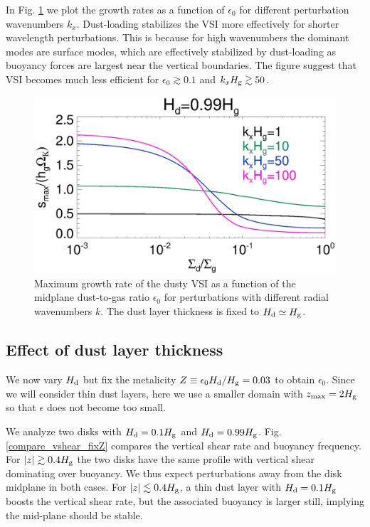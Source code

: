 In Fig. \ref{vsi_dust_loading_vareps} we plot the growth rates as a
function of $\epsilon_0$ for different perturbation wavenumbers
$k_x$. Dust-loading stabilizes the VSI more effectively for shorter
wavelength perturbations. This is because for high wavenumbers the
dominant modes are surface modes, which are effectively stabilized by
dust-loading as buoyancy forces are largest near the vertical 
boundaries. The figure suggest that VSI becomes much less efficient
for $\epsilon_0\gtrsim 0.1$ and $k_xH_\mathrm{g}\gtrsim 50$. 

\begin{figure}
  \includegraphics[width=\linewidth]{figures/compare_eigenvals_vareps2} 
  \caption{Maximum growth rate of the dusty VSI as a function of the
    midplane dust-to-gas ratio $\epsilon_0$ for perturbations with
    different radial wavenumbers $k$. The dust layer thickness is
    fixed to $H_\mathrm{d}\simeq H_\mathrm{g}$. 
    \label{vsi_dust_loading_vareps}
    }
\end{figure}




\subsection{Effect of dust layer thickness} 
We now vary $H_\mathrm{d}$ but fix the metalicity 
$Z \equiv \epsilon_0 H_\mathrm{d}/H_\mathrm{g} = 0.03$ to obtain $\epsilon_0$. Since we
will consider thin dust layers, here we use a smaller   
domain with $z_\mathrm{max}=2H_\mathrm{g}$ so that $\epsilon$ does not become
too small. 

We analyze two disks with $H_\mathrm{d}=0.1H_\mathrm{g}$ and 
$H_\mathrm{d}=0.99H_\mathrm{g}$. Fig. \ref{compare_vshear_fixZ} compares the vertical
shear  rate and buoyancy frequency. For $|z|\gtrsim 0.4H_\mathrm{g}$ the two
disks have the same profile with vertical shear dominating over
buoyancy. We thus expect perturbations away from the disk midplane in 
both cases. For $|z|\lesssim 0.4H_\mathrm{g}$, a thin dust 
layer with $H_\mathrm{d}=0.1H_\mathrm{g}$ boosts the vertical shear rate, but the
associated buoyancy is larger still, implying the mid-plane should be
stable. 

